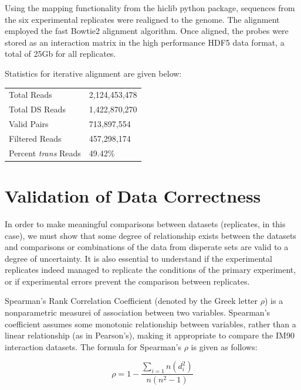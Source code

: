 \documentclass[phd,tocprelim]{cornell}
\begin{document}
Using the mapping functionality from the hiclib python package\cite{imakaev2012},
sequences from the six experimental replicates were realigned to the genome.  The
alignment employed the fast Bowtie2 alignment algorithm\cite{langmead2012}.  Once
aligned, the probes were stored as an interaction matrix in the high performance
HDF5\cite{hdf5} data format, a total of 25Gb for all replicates.

Statistics for iterative alignment are given below:

\begin{center}
  \begin{table}
    \begin{tabular}{l l}
    Total Reads & 2,124,453,478 \\
    Total DS Reads & 1,422,870,270 \\
    Valid Pairs & 713,897,554 \\
    Filtered Reads & 457,298,174 \\
    Percent \textit{trans} Reads & 49.42\% \\
    \end{tabular}
  \end{table}
\end{center}


\chapter{Validation of Data Correctness}

In order to make meaningful comparisons between datasets (replicates,
in this case), we must show that some degree of relationship exists between
the datasets and comparisons or combinations of the data from disperate sets
are valid to a degree of uncertainty.  It is also essential to understand if the
experimental replicates indeed managed to replicate the conditions of the primary
experiment, or if experimental errors prevent the comparison between replicates.

Spearman's Rank Correlation Coefficient (denoted by the Greek letter $\rho$) is
a nonparametric measurei of association between two variables.
Spearman's coefficient assumes some monotonic relationship between variables,
rather than a linear relationship (as in Pearson's), making it appropriate
to compare the IM90 interaction datasets.  The formula for Spearman's $\rho$ is
given as follows:

\begin{equation}
\rho = 1 - \frac{\sum_{i=1}{n}(d_i^2)}{n(n^2 - 1)}
\end{equation}
\end{document}
